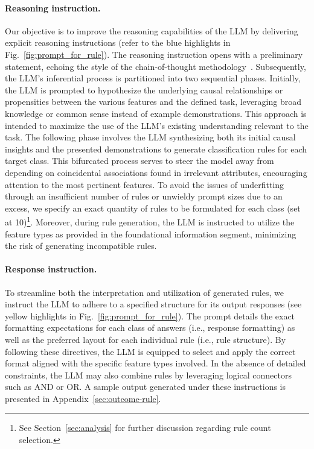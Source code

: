 \paragraph{Reasoning instruction.} Our objective is to improve the reasoning capabilities of the LLM by delivering explicit reasoning instructions (refer to the blue highlights in Fig.~\ref{fig:prompt_for_rule}). The reasoning instruction opens with a preliminary statement, echoing the style of the chain-of-thought methodology~\cite{wei2022chain}. Subsequently, the LLM’s inferential process is partitioned into two sequential phases. Initially, the LLM is prompted to hypothesize the underlying causal relationships or propensities between the various features and the defined task, leveraging broad knowledge or common sense instead of example demonstrations. This approach is intended to maximize the use of the LLM’s existing understanding relevant to the task. The following phase involves the LLM synthesizing both its initial causal insights and the presented demonstrations to generate classification rules for each target class. This bifurcated process serves to steer the model away from depending on coincidental associations found in irrelevant attributes, encouraging attention to the most pertinent features. To avoid the issues of underfitting through an insufficient number of rules or unwieldy prompt sizes due to an excess, we specify an exact quantity of rules to be formulated for each class (set at 10)\footnote{See Section~\ref{sec:analysis} for further discussion regarding rule count selection.}. Moreover, during rule generation, the LLM is instructed to utilize the feature types as provided in the foundational information segment, minimizing the risk of generating incompatible rules.

\vspace*{-0.12in}
\paragraph{Response instruction.} To streamline both the interpretation and utilization of generated rules, we instruct the LLM to adhere to a specified structure for its output responses (see yellow highlights in Fig.~\ref{fig:prompt_for_rule}). The prompt details the exact formatting expectations for each class of answers (i.e., response formatting) as well as the preferred layout for each individual rule (i.e., rule structure). By following these directives, the LLM is equipped to select and apply the correct format aligned with the specific feature types involved. In the absence of detailed constraints, the LLM may also combine rules by leveraging logical connectors such as AND or OR. A sample output generated under these instructions is presented in Appendix~\ref{sec:outcome-rule}.

